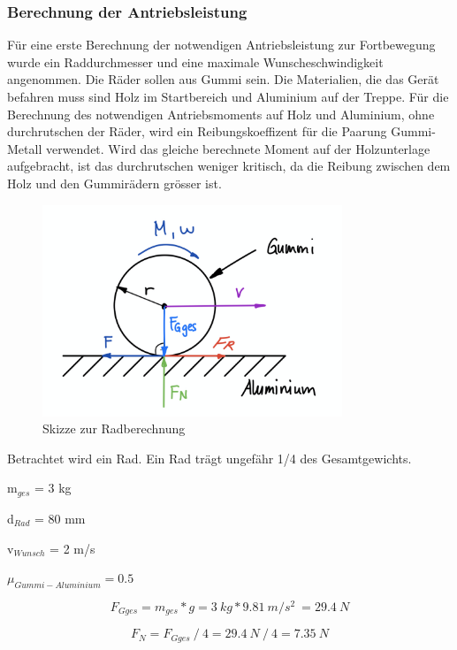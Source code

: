 \newpage

\subsubsection{Berechnung der Antriebsleistung}

Für eine erste Berechnung der notwendigen Antriebsleistung zur Fortbewegung wurde ein Raddurchmesser und eine maximale Wunscheschwindigkeit angenommen. Die Räder sollen aus Gummi sein. Die Materialien, die das Gerät befahren muss sind Holz im Startbereich und Aluminium auf der Treppe. Für die Berechnung des notwendigen Antriebsmoments auf Holz und Aluminium, ohne durchrutschen der Räder, wird ein Reibungskoeffizent \cite{Reibung} für die Paarung Gummi-Metall verwendet. Wird das gleiche berechnete Moment auf der Holzunterlage aufgebracht, ist das durchrutschen weniger kritisch, da die Reibung zwischen dem Holz und den Gummirädern grösser ist.

\begin{figure}[H]
  \includegraphics[width=0.8\textwidth]{img/Fortbewegung/Radberechnung.png}
  \centering
  \caption{Skizze zur Radberechnung}
\end{figure}

\newpage

Betrachtet wird ein Rad. Ein Rad trägt ungefähr 1/4 des Gesamtgewichts.

m$_{ges}$ = 3 kg

d$_{Rad}$ = 80 mm

v$_{Wunsch}$ = 2 m/s

\( \mu_{Gummi-Aluminium} = 0.5\)

\[F_{Gges} = m_{ges} * g = 3\ kg * 9.81\ m/s^2\ = 29.4\ N \]

\[F_N = F_{Gges}\ /\ 4 = 29.4\ N\ /\ 4 = 7.35\ N \]

